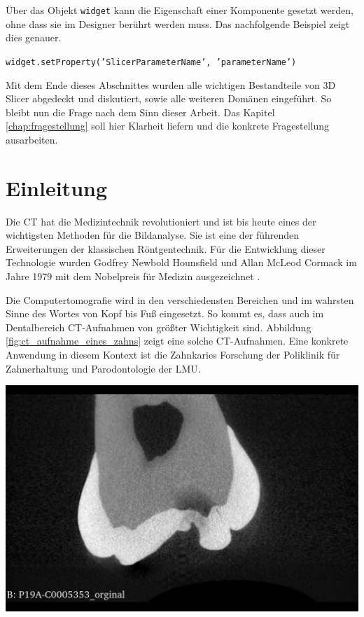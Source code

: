 Über das Objekt \texttt{widget} kann die Eigenschaft einer Komponente gesetzt
werden, ohne dass sie im Designer berührt werden muss. Das nachfolgende Beispiel
zeigt dies genauer.
\begin{center}
	\texttt{widget.setProperty('SlicerParameterName', 'parameterName')}
\end{center}
Mit dem Ende dieses Abschnittes wurden alle wichtigen Bestandteile von 3D Slicer
abgedeckt und diskutiert, sowie alle weiteren Domänen eingeführt. So bleibt nun die
Frage nach dem Sinn dieser Arbeit. Das Kapitel \ref{chap:fragestellung} soll
hier Klarheit liefern und die konkrete Fragestellung ausarbeiten.

\chapter{Einleitung}
\label{chap:einleitung} Die \ac{CT} hat die Medizintechnik revolutioniert und
ist bis heute eines der wichtigsten Methoden für die Bildanalyse. Sie ist eine der
führenden Erweiterungen der klassischen Röntgentechnik. Für die Entwicklung
dieser Technologie wurden Godfrey Newbold Hounsfield und Allan McLeod Cormack im
Jahre 1979 mit dem Nobelpreis für Medizin ausgezeichnet \citep[.vgl][S.~12]{handels2000}.

\begin{minipage}{0.45\textwidth}
	Die Computertomografie wird in den verschiedensten Bereichen und im wahrsten Sinne
	des Wortes von Kopf bis Fuß eingesetzt. So kommt es, dass auch im Dentalbereich
	\ac{CT}-Aufnahmen von größter Wichtigkeit sind. Abbildung \ref{fig:ct_aufnahme_eines_zahns}
	zeigt eine solche \ac{CT}-Aufnahmen. Eine konkrete Anwendung in diesem Kontext
	ist die Zahnkaries Forschung der Poliklinik für Zahnerhaltung und Parodontologie
	der \ac{LMU}.
\end{minipage}
\hfill
\begin{minipage}{0.45\textwidth}
	\centering
	\includegraphics[scale=0.2, width=\textwidth]{img/micro_ct_orginal.jpg}
	 \label{fig:ct_aufnahme_eines_zahns}
\end{minipage}

